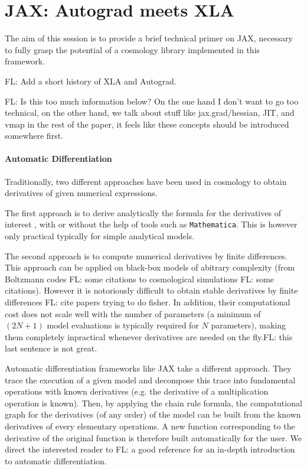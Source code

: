 \documentclass[twocolumn,twocolappendix,nofootinbib,iop]{openjournal}
\newcommand{\FrL}[1]{{\color{cyan}FL: #1}}
\begin{document}
\section{JAX: Autograd meets XLA}
\label{sec-primer}

The aim of this session is to provide a brief technical primer on JAX, necessary to fully grasp the potential of a cosmology library implemented in this framework.

\FrL{Add a short history of XLA and Autograd.}


\FrL{Is this too much information below? On the one hand I don't want to go too technical, on the other hand, we talk about stuff like jax.grad/hessian, JIT, and vmap in the rest of the paper, it feels like these concepts should be introduced somewhere first.}

\paragraph{Automatic Differentiation} Traditionally, two different approaches have been used in cosmology to obtain derivatives of given numerical expressions.

The first approach is to derive analytically the formula for the derivatives of interest \citep{BORG}, with or without the help of tools such as \texttt{Mathematica}. This is however only practical typically for simple analytical models.

The second approach is to compute numerical derivatives by finite differences. This approach can be applied on black-box models of abitrary complexity (from Boltzmann codes \FrL{some citations} to cosmological simulations \FrL{some citations}). However it is notoriously difficult to obtain stable derivatives by finite differences \FrL{cite papers trying to do fisher}. In addition, their computational cost does not scale well with the number of parameters (a minimum of $(2N+1)$ model evaluations is typically required for $N$ parameters), making them completely inpractical whenever derivatives are needed on the fly.\FrL{this last sentence is not great.}

Automatic differentiation frameworks like JAX take a different approach. They trace the execution of a given model and decompose this trace into fundamental operations with known derivatives (e.g. the derivative of a multiplication operation is known). Then, by applying the chain rule formula, the compatutional graph for the derivatives (of any order) of the model can be built from the known derivatives of every elementary operations. A new function corresponding to the derivative of the original function is therefore built automatically for the user. We direct the interested reader to \FrL{a good reference} for an in-depth introduction to automatic differentiation. 
\end{document}
